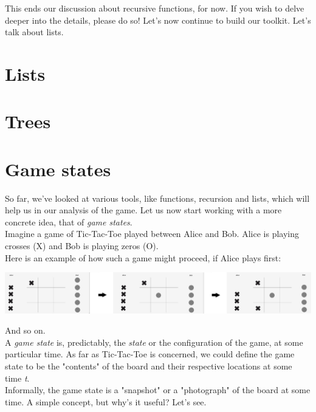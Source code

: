 \documentclass{article}
\begin{document}
\noindent This ends our discussion about recursive functions, for now. If you wish to delve deeper into the details, please do so! Let's now continue to build our toolkit. Let's talk about lists. 

\section{Lists}

\section{Trees}

\section{Game states} 

So far, we've looked at various tools, like functions, recursion and lists,
which will help us in our analysis of the game. Let us now start working with
a more concrete idea, that of \textit{game states}. \\

\noindent Imagine a game of Tic-Tac-Toe played between Alice and Bob. Alice is playing crosses (X) and Bob is playing zeros (O). \\

\noindent Here is an example of how such a game might proceed, if Alice plays first:

\begin{center}
    \includegraphics[scale=0.11]{AliceVBob}
\end{center}

\noindent And so on. \\

\noindent A \textit{game state} is, predictably, the \textit{state} or the configuration of the game, at some particular time. As far as Tic-Tac-Toe is concerned, we could define the game state to be the "contents" of the board and their respective locations at some time \textit{t}. \\

\noindent Informally, the game state is a "snapshot" or a "photograph" of the board at some time. A simple concept, but why's it useful? Let's see. 
\end{document}
